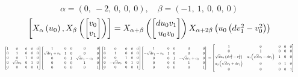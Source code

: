 \documentclass[11pt]{article}
\theoremstyle{definition}
\begin{document}
\[
\alpha = \left( 0, \  -2, \  0, \  0, \  0\right), \quad \beta = \left( -1, \  1, \  0, \  0, \  0\right)
\]
\[
\scaletoalign{\textwidth}{\left[ X_{\alpha}\left(u_{0}\right), X_{\beta}\left(\left[\begin{matrix}v_{0}\\v_{1}\end{matrix}\right]\right) \right] = X_{\alpha + \beta}\left(\left[\begin{matrix}d u_{0} v_{1}\\u_{0} v_{0}\end{matrix}\right]\right) X_{\alpha + 2\beta}\left(u_{0} \left(d v_{1}^{2} - v_{0}^{2}\right)\right)}
\]
\[
\scaletoalign{\textwidth}{{\left[\begin{matrix}1 & 0 & 0 & 0 & 0\\0 & 1 & 0 & 0 & 0\\0 & 0 & 1 & 0 & 0\\0 & \sqrt{d} u_{0} & 0 & 1 & 0\\0 & 0 & 0 & 0 & 1\end{matrix}\right]} {\left[\begin{matrix}1 & 0 & 0 & 0 & 0\\\sqrt{d} v_{1} + v_{0} & 1 & 0 & 0 & 0\\0 & 0 & 1 & \sqrt{d} v_{1} - v_{0} & 0\\0 & 0 & 0 & 1 & 0\\0 & 0 & 0 & 0 & 1\end{matrix}\right]} {\left[\begin{matrix}1 & 0 & 0 & 0 & 0\\0 & 1 & 0 & 0 & 0\\0 & 0 & 1 & 0 & 0\\0 & - \sqrt{d} u_{0} & 0 & 1 & 0\\0 & 0 & 0 & 0 & 1\end{matrix}\right]} {\left[\begin{matrix}1 & 0 & 0 & 0 & 0\\- \sqrt{d} v_{1} - v_{0} & 1 & 0 & 0 & 0\\0 & 0 & 1 & - \sqrt{d} v_{1} + v_{0} & 0\\0 & 0 & 0 & 1 & 0\\0 & 0 & 0 & 0 & 1\end{matrix}\right]} = {\left[\begin{matrix}1 & 0 & 0 & 0 & 0\\0 & 1 & 0 & 0 & 0\\\sqrt{d} u_{0} \left(d v_{1}^{2} - v_{0}^{2}\right) & u_{0} \left(\sqrt{d} v_{0} - d v_{1}\right) & 1 & 0 & 0\\u_{0} \left(\sqrt{d} v_{0} + d v_{1}\right) & 0 & 0 & 1 & 0\\0 & 0 & 0 & 0 & 1\end{matrix}\right]}}
\]
\end{document}

